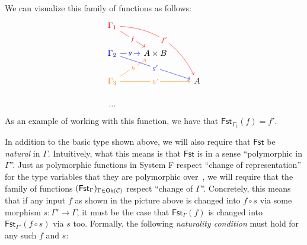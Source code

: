 We can visualize this family of functions as follows:
\begin{equation}
\begin{tikzcd}
  {\color{red} \Gamma_1} \arrow[rd, "f" description, color = red] \arrow[rrdd, "f'" description, bend left, color = red] &             &   \\
  {\color{blue}\Gamma_2} \arrow[r, "g" description, color = blue] \arrow[rrd, "g'" description, color = blue]              & A \times B  &   \\
  {\color{orange} \Gamma_3} \arrow[ru, "h" description, color = orange] \arrow[rr, "h'" description, color = orange]              &             & A \\
  ...                                                                               &             &  
  \end{tikzcd}
  \label{cd:indexed-fam}
\end{equation}
As an example of working with this function, we have that
$\mathsf{Fst}_{\Gamma_1}(f) = f'$.

In addition to the basic type shown above, we will also require that \(\mathsf{Fst}\)
be \emph{natural} in \(\Gamma\).
Intuitively, what this means is that \(\mathsf{Fst}\) is in a sense ``polymorphic in \(\Gamma\)''.
Just as polymorphic functions in System F
respect ``change of representation'' for the type variables that they are polymorphic over~\citep{reynolds1983types},
we will require that the family of functions \((\mathsf{Fst}_\Gamma)_{\Gamma\in\mathsf{Ob}(\mathcal C)}\)
respect ``change of \(\Gamma\)''.
Concretely, this means that if any input \(f\) as shown in the picture above is changed into \(f \circ s\) via some morphism
$s : \Gamma' \to \Gamma$,
it must be the case that \(\mathsf{Fst}_\Gamma(f)\) is changed into \(\mathsf{Fst}_{\Gamma'}(f\circ s)\)
via \(s\) too. Formally, the following \emph{naturality condition} must hold for any such \(f\) and \(s\):

